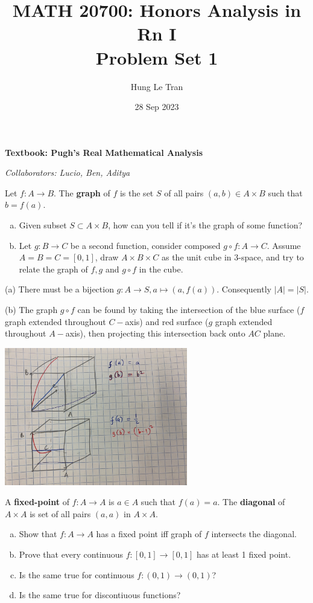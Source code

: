 \documentclass[a4paper, 11pt]{article}
\title{MATH 20700: Honors Analysis in Rn I \\ \large Problem Set 1}
\date{28 Sep 2023}
\author{Hung Le Tran}
\begin{document}
\maketitle
\textbf{Textbook: Pugh's Real Mathematical Analysis}

\textit{Collaborators: Lucio, Ben, Aditya}
\setcounter{section}{1}
\begin{problem} [1.21]
    Let $f: A \to B$. The \textbf{graph} of $f$ is the set $S$ of all pairs $(a, b) \in A \times B$ such that $b = f(a)$.
    \begin{enumerate} [(a)]
        \item Given subset $S \subset A \times B$, how can you tell if it's the graph of some function?
        \item Let $g: B \to C$ be a second function, consider composed $g \circ f: A \to C$. Assume $A = B = C = [0, 1]$, draw $A \times B \times C$ as the unit cube in 3-space, and try to relate the graph of $f, g$ and $g \circ f$ in the cube.
    \end{enumerate}
\end{problem}

\begin{solution}

    (a)
    There must be a bijection $g: A \to S, a \mapsto (a, f(a))$. Consequently $|A| = |S|$.
    
    (b)
    The graph $g \circ f$ can be found by taking the intersection of the blue surface ($f$ graph extended throughout $C-$axis) and red surface ($g$ graph extended throughout $A-$axis), then projecting this intersection back onto $AC$ plane.
    \begin{center}
        \includegraphics[width=8cm]{figures/1.21.jpeg}
    \end{center}
\end{solution}
\begin{problem} [1.22]
    A \textbf{fixed-point} of $f: A \to A$ is $a \in A$ such that $f(a) = a$. The \textbf{diagonal} of $A \times A$ is set of all pairs $(a, a)$ in $A \times A$.
    \begin{enumerate} [(a)]
        \item Show that $f: A \to A$ has a fixed point iff graph of $f$ intersects the diagonal.
        \item Prove that every continuous $f: [0,1] \to [0,1]$ has at least 1 fixed point.
        \item Is the same true for continuous $f: (0,1) \to (0,1)$?
        \item Is the same true for discontiuous functions?
    \end{enumerate}
\end{problem}
\end{document}

